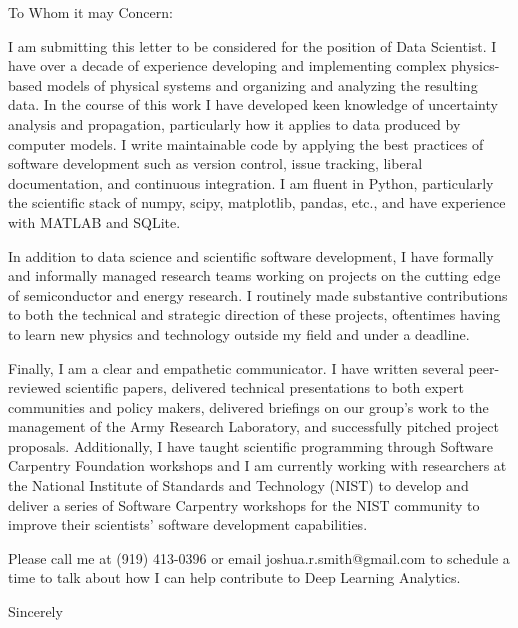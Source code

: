 \documentclass[letterpaper,10pt]{letter}
\begin{document}

\begin{letter}{}

\address{2515 13th St NW\\
         Apt. 510\\
         Washington, DC 20009}

\opening{To Whom it may Concern:}

I am submitting this letter to be considered for the position of Data Scientist.
I have over a decade of experience developing and implementing complex physics-based models of physical systems and organizing and analyzing the resulting data.
In the course of this work I have developed keen knowledge of uncertainty analysis and propagation, particularly how it applies to data produced by computer models.
I write maintainable code by applying the best practices of software development such as version control, issue tracking, liberal documentation, and continuous integration. 
I am fluent in Python, particularly the scientific stack of numpy, scipy, matplotlib, pandas, etc., and have experience with MATLAB and SQLite.


In addition to data science and scientific software development, I have formally and informally managed research teams working on projects on the cutting edge of semiconductor and energy research.
I routinely made substantive contributions to both the technical and strategic direction of these projects, oftentimes having to learn new physics and technology outside my field and under a deadline.


Finally, I am a clear and empathetic communicator. 
I have written several peer-reviewed scientific papers, delivered technical presentations to both expert communities and policy makers, delivered briefings on our group's work to the management of the Army Research Laboratory, and successfully pitched project proposals.
Additionally, I have taught scientific programming through Software Carpentry Foundation workshops and I am currently working with researchers at the National Institute of Standards and Technology (NIST) to develop and deliver a series of Software Carpentry workshops for the NIST community to improve their scientists' software development capabilities.


Please call me at (919) 413-0396 or email joshua.r.smith@gmail.com to schedule a time to talk about how I can help contribute to Deep Learning Analytics.


\signature{Joshua Ryan Smith}

\closing{Sincerely}


\end{letter}
\end{document}
